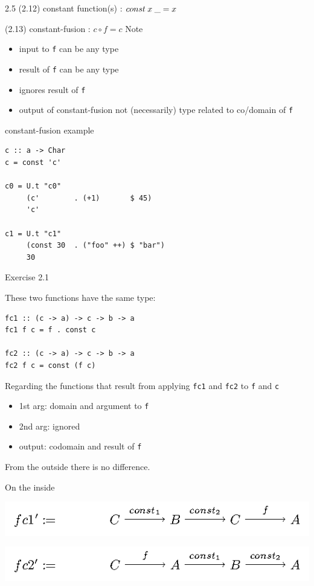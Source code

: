\documentclass[presentation]{beamer}
\begin{document}
\begin{frame}[fragile,label=sec-4]{2.5  (2.12) constant function(s) : $const \hspace{0.25em} x \hspace{0.25em} \_ =  x$}
\begin{block}{(2.13) constant-fusion : $c \circ f = c$}
Note
\begin{itemize}
\item input to \texttt{f} can be any type
\item result of \texttt{f} can be any type
\item ignores result of \texttt{f}
\item output of constant-fusion not (necessarily) type related to co/domain of \texttt{f}
\end{itemize}

constant-fusion example

\begin{verbatim}
c :: a -> Char
c = const 'c'

c0 = U.t "c0"
     (c'        . (+1)       $ 45)
     'c'

c1 = U.t "c1"
     (const 30  . ("foo" ++) $ "bar")
     30
\end{verbatim}

\alert{Exercise 2.1}

These two functions have the same type:

\begin{verbatim}
fc1 :: (c -> a) -> c -> b -> a
fc1 f c = f . const c

fc2 :: (c -> a) -> c -> b -> a
fc2 f c = const (f c)
\end{verbatim}

Regarding the functions that result from applying \texttt{fc1} and \texttt{fc2} to \texttt{f} and \texttt{c}

\begin{itemize}
\item 1st arg: domain and argument to \texttt{f}
\item 2nd arg: ignored
\item output: codomain and result of \texttt{f}
\end{itemize}

From the outside there is no difference.

On the inside

\includegraphics[width=.9\linewidth]{./e2-1a.png}

\includegraphics[width=.9\linewidth]{./e2-1b.png}


\end{block}
\end{frame}
\end{document}
